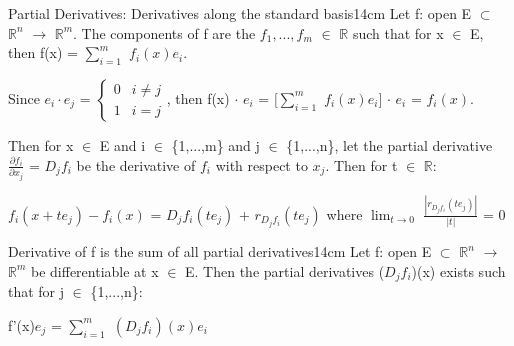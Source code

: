     \vspace{0.5cm}



    \begin{definition}
    {Partial Derivatives: Derivatives along the standard basis}{14cm}
        Let f: open E $\subset$ $\mathbb{R}^n$ $\rightarrow$ $\mathbb{R}^m$.
        The components of f are the $f_1,...,f_m$ $\in$ $\mathbb{R}$ such that
        for x $\in$ E, then f(x) = $\sum_{i=1}^m$ $f_i(x) e_i$.

        Since $e_i \cdot e_j$ =
        $
        \begin{cases}
            0 & i \not = j \\
            1 & i = j
        \end{cases}$, then
        f(x) $\cdot$ $e_i$
        = $[\sum_{i=1}^m$ $f_i(x) e_i]$ $\cdot$ $e_i$
        = $f_i(x)$.

        \vspace{0.2cm}

        Then for x $\in$ E and i $\in$ \{1,...,m\} and j $\in$ \{1,...,n\},
        let the {\color{lblue} partial derivative}
        $\frac{\partial f_i}{\partial x_j}$ = $D_jf_i$
        be the derivative of $f_i$ with respect to $x_j$.
        Then for t $\in$ $\mathbb{R}$:

        \hspace{0.5cm}
        $f_i(x+te_j) - f_i(x)$ = $D_jf_i(te_j)$ + $r_{D_jf_i}(te_j)$
        \hspace{0.7cm}
        where $\lim_{t \rightarrow 0}$ $\frac{|r_{D_jf_i}(te_j)|}{|t|}$ = 0
    \end{definition}

    \newpage



    \begin{wtheorem}{Derivative of f is the sum of all partial derivatives}{14cm}
        Let f: open E $\subset$ $\mathbb{R}^n$ $\rightarrow$ $\mathbb{R}^m$
        be differentiable at x $\in$ E. Then the partial derivatives
        ($D_jf_i$)(x) exists such that for j $\in$ \{1,...,n\}:

        \hspace{0.5cm}
        f'(x)$e_j$ = $\sum_{i=1}^m$ $(D_jf_i)(x)e_i$
    \end{wtheorem}

